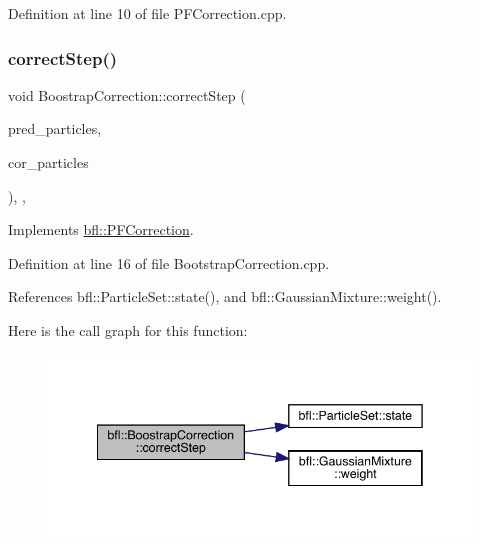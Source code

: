 Definition at line 10 of file P\+F\+Correction.\+cpp.

\mbox{\label{classbfl_1_1BoostrapCorrection_a493eed345120c5babb0f3591d9c7c854}} 
\subsubsection{\texorpdfstring{correct\+Step()}{correctStep()}}
{\footnotesize\ttfamily void Boostrap\+Correction\+::correct\+Step (\begin{DoxyParamCaption}\item[{const \mbox{\hyperlink{classbfl_1_1ParticleSet}{Particle\+Set}} \&}]{pred\+\_\+particles,  }\item[{\mbox{\hyperlink{classbfl_1_1ParticleSet}{Particle\+Set}} \&}]{cor\+\_\+particles }\end{DoxyParamCaption})\hspace{0.3cm}{\ttfamily [override]}, {\ttfamily [protected]}, {\ttfamily [virtual]}}



Implements \mbox{\hyperlink{classbfl_1_1PFCorrection_ae0413156a1258d88485e57a983c89af1}{bfl\+::\+P\+F\+Correction}}.



Definition at line 16 of file Bootstrap\+Correction.\+cpp.



References bfl\+::\+Particle\+Set\+::state(), and bfl\+::\+Gaussian\+Mixture\+::weight().

Here is the call graph for this function\+:
\nopagebreak
\begin{figure}[H]
\begin{center}
\leavevmode
\includegraphics[width=342pt]{classbfl_1_1BoostrapCorrection_a493eed345120c5babb0f3591d9c7c854_cgraph}
\end{center}
\end{figure}
\mbox{\label{classbfl_1_1BoostrapCorrection_a18ad4ccfd9d7cf008011cbc79a0cea8f}} 

